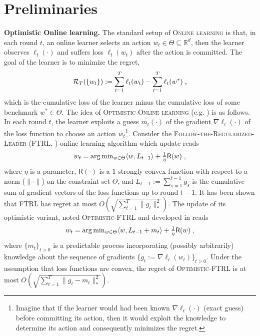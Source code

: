 \documentclass[11pt]{article}
\theoremstyle{k}
\begin{document}
\section{Preliminaries}\label{sec:prelim}
\textbf{Optimistic Online learning.}\hspace{0.1cm}
The standard setup of \textsc{Online learning} is that, in each round $t$, an online learner selects an action $w_{t} \in \Theta \subseteq \mathbb R^{d}$, then the learner observes $\ell_{t}(\cdot)$ and suffers loss $\ell_{t}(w_t)$ after the action is committed.
The goal of the learner is to minimize the regret, 
$$\mathcal{R}_{T}( \{ w_t \} ):= \sum_{t=1}^T \ell_{t}(w_t) - \sum_{t=1}^T \ell_{t}(w^*)\;,$$
which is the cumulative loss of the learner minus the cumulative loss of some benchmark $w^{*} \in \Theta$.
The idea of \textsc{Optimistic Online learning} (e.g. \citep{CJ12,rakhlin2013online,SALS15,ALLW18}) is as follows.
In each round $t$, the learner exploits a guess $m_t(\cdot)$ of the gradient $\nabla \ell_t(\cdot)$ of the loss function to choose an action $w_t$\footnote{Imagine that if the learner would had been known $\nabla \ell_t(\cdot)$ (\ie exact guess) before committing its action, then it would exploit the knowledge to determine its action and consequently minimizes the regret.}. 
Consider the \textsc{Follow-the-Regularized-Leader} (\textsc{FTRL}, \citep{H14}) online learning algorithm which update reads
\begin{equation} \label{optFTRL}
\textstyle w_t  = \arg \min_{w \in \Theta} \langle w , L_{t-1} \rangle + \frac{1}{\eta} \textsf{R}(w) \;,
\end{equation}
where $\eta$ is a parameter, $\textsf{R}(\cdot)$ is a $1$-strongly convex function with respect to a norm ($\| \cdot \|$) on the constraint set $\Theta$, and $L_{t-1}:= \sum_{s=1}^{t-1} g_s$ is the cumulative sum of gradient vectors of the loss functions up to round $t-1$. It has been shown that FTRL has regret at most $O(\sqrt{\sum_{t=1}^T \| g_t \|_*^2})$.
The update of its optimistic variant, noted \textsc{Optimistic-FTRL} and developed in \citep{SALS15} reads
\begin{equation} \label{optFTRL}
\textstyle w_t  = \arg \min_{w \in \Theta} \langle w , L_{t-1} + m_t \rangle + \frac{1}{\eta} \textsf{R}(w)\;,
\end{equation}
where $\{m_{t}\}_{t>0}$ is a predictable process incorporating (possibly arbitrarily) knowledge about the sequence of gradients $\{ g_{t}:=\nabla \ell_t(w_t)\}_{t>0}$.
Under the assumption that loss functions are convex, the regret of \textsc{Optimistic-FTRL} is at most $O(\sqrt{\sum_{t=1}^T \| g_t - m_t \|_*^2 } )$.
\end{document}
